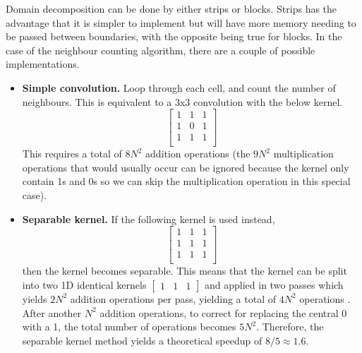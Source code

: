     Domain decomposition can be done by either strips or blocks.
    Strips has the advantage that it is simpler to implement but will have more memory needing to be passed between
    boundaries, with the opposite being true for blocks.
    In the case of the neighbour counting algorithm, there are a couple of possible implementations.
    \begin{itemize}
        \item \textbf{Simple convolution.} Loop through each cell, and count the number of neighbours.
            This is equivalent to a 3x3 convolution with the below kernel.
            \begin{equation}
            \begin{bmatrix}
            1 & 1 & 1 \\
            1 & 0 & 1 \\
            1 & 1 & 1 \\
            \end{bmatrix}\label{eq:kernel1}
            \end{equation}
            This requires a total of $8N^{2}$ addition operations (the $9N^{2}$ multiplication operations that would usually occur can
            be ignored because the kernel only contain 1s and 0s so we can skip the multiplication operation in this special case).
        \item \textbf{Separable kernel.} If the following kernel is used instead,
            \begin{equation}
            \begin{bmatrix}
            1 & 1 & 1 \\
            1 & 1 & 1 \\
            1 & 1 & 1 \\
            \end{bmatrix}\label{eq:kernel2}
            \end{equation}
            then the kernel becomes separable.
            This means that the kernel can be split into two 1D identical kernels \(\begin{bmatrix} 1 & 1 & 1 \end{bmatrix}\) and
            applied in two passes which yields $2N^{2}$ addition operations per pass, yielding a total of $4N^{2}$ operations \cite{separable-kernel}.
            After another ${N^{2}}$ addition operations, to correct for replacing the central 0 with a 1, the total number of
            operations becomes $5N^{2}$.
            Therefore, the separable kernel method yields a theoretical speedup of $8/5 \approx 1.6$.
    \end{itemize}

